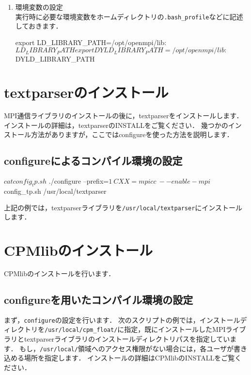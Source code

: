 \begin{enumerate}
{\small
{}
}

\item 環境変数の設定\\
実行時に必要な環境変数をホームディレクトリの\verb|.bash_profile|などに記述しておきます．

{\small
\begin{program}
export LD_LIBRARY_PATH=/opt/openmpi/lib:$LD_LIBRARY_PATH
export DYLD_LIBRARY_PATH=/opt/openmpi/lib:$DYLD_LIBRARY_PATH
\end{program}
}

\end{enumerate}



%
\section{textparserのインストール}

MPI通信ライブラリのインストールの後に，textparserをインストールします．
インストールの詳細は，textparserのINSTALLをご覧ください．
幾つかのインストール方法がありますが，ここではconfigureを使った方法を説明します．

%
\subsection{configureによるコンパイル環境の設定}

{\small
\begin{program}
$ cat config_tp.sh
$ ./configure --prefix=$1 \
              CXX=mpicc \
	      --enable-mpi
	    
$ config_tp.sh /usr/local/textparser
\end{program}
}

上記の例では，textparserライブラリを\verb|/usr/local/textparser|にインストールします．



%
\section{CPMlibのインストール}

CPMlibのインストールを行います．

%
\subsection{configureを用いたコンパイル環境の設定}
まず，\verb|configure|の設定を行います．
次のスクリプトの例では，インストールディレクトリを\verb|/usr/local/cpm_float/|に指定，既にインストールしたMPIライブラリとtextparserライブラリのインストールディレクトリパスを指定しています．
もし，\verb|/usr/local/|領域へのアクセス権限がない場合には，各ユーザが書き込める場所を指定します．
インストールの詳細はCPMlibのINSTALLをご覧ください．

